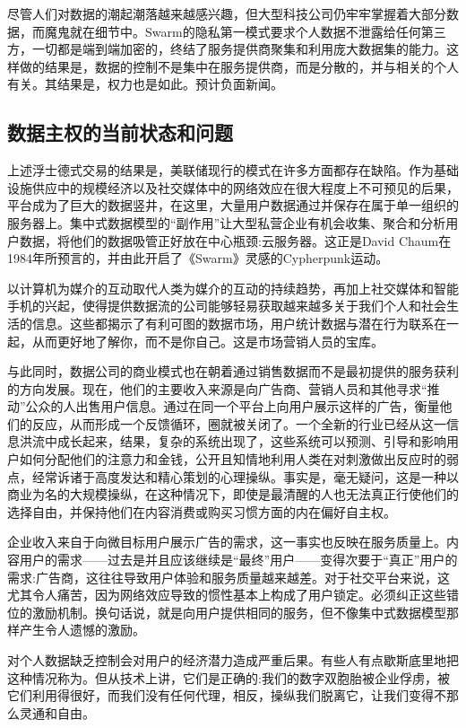 尽管人们对数据的潮起潮落越来越感兴趣，但大型科技公司仍牢牢掌握着大部分数据，而魔鬼就在细节中。Swarm的隐私第一模式要求个人数据不泄露给任何第三方，一切都是端到端加密的，终结了服务提供商聚集和利用庞大数据集的能力。这样做的结果是，数据的控制不是集中在服务提供商，而是分散的，并与相关的个人有关。其结果是，权力也是如此。预计负面新闻。

\subsection{数据主权的当前状态和问题\statusgreen }\label{sec:data-sovereignty}

上述浮士德式交易的结果是，美联储现行的模式在许多方面都存在缺陷。作为基础设施供应中的规模经济以及社交媒体中的网络效应在很大程度上不可预见的后果，平台成为了巨大的数据竖井，在这里，大量用户数据通过并保存在属于单一组织的服务器上。集中式数据模型的“副作用”让大型私营企业有机会收集、聚合和分析用户数据，将他们的数据吸管正好放在中心瓶颈:云服务器。这正是David Chaum在1984年所预言的，并由此开启了《Swarm》灵感的Cypherpunk运动。

以计算机为媒介的互动取代人类为媒介的互动的持续趋势，再加上社交媒体和智能手机的兴起，使得提供数据流的公司能够轻易获取越来越多关于我们个人和社会生活的信息。这些都揭示了有利可图的数据市场，用户统计数据与潜在行为联系在一起，从而更好地了解你，而不是你自己。这是市场营销人员的宝库。

与此同时，数据公司的商业模式也在朝着通过销售数据而不是最初提供的服务获利的方向发展。现在，他们的主要收入来源是向广告商、营销人员和其他寻求“推动”公众的人出售用户信息。通过在同一个平台上向用户展示这样的广告，衡量他们的反应，从而形成一个反馈循环，圈就被关闭了。一个全新的行业已经从这一信息洪流中成长起来，结果，复杂的系统出现了，这些系统可以预测、引导和影响用户如何分配他们的注意力和金钱，公开且知情地利用人类在对刺激做出反应时的弱点，经常诉诸于高度发达和精心策划的心理操纵。事实是，毫无疑问，这是一种以商业为名的大规模操纵，在这种情况下，即使是最清醒的人也无法真正行使他们的选择自由，并保持他们在内容消费或购买习惯方面的内在偏好自主权。

企业收入来自于向微目标用户展示广告的需求，这一事实也反映在服务质量上。内容用户的需求——过去是并且应该继续是“最终”用户——变得次要于“真正”用户的需求:广告商，这往往导致用户体验和服务质量越来越差。对于社交平台来说，这尤其令人痛苦，因为网络效应导致的惯性基本上构成了用户锁定。必须纠正这些错位的激励机制。换句话说，就是向用户提供相同的服务，但不像集中式数据模型那样产生令人遗憾的激励。

对个人数据缺乏控制会对用户的经济潜力造成严重后果。有些人有点歇斯底里地把这种情况称为。但从技术上讲，它们是正确的:我们的数字双胞胎被企业俘虏，被它们利用得很好，而我们没有任何代理，相反，操纵我们脱离它，让我们变得不那么灵通和自由。

